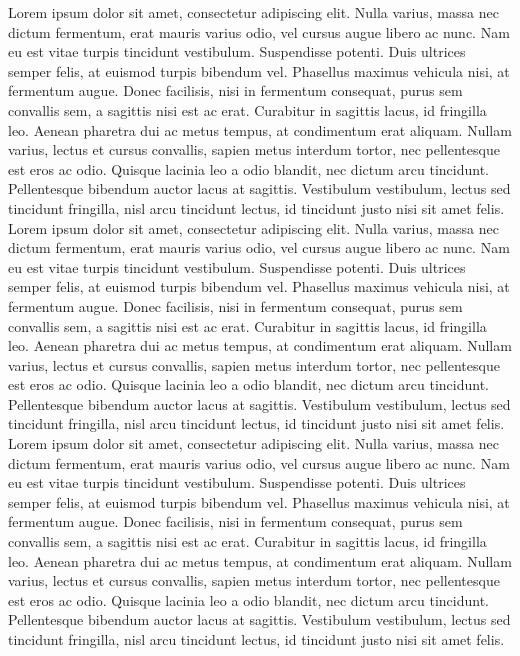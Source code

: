 \documentclass{article}  %
\begin{document}
\begin{justify}
Lorem ipsum dolor sit amet, consectetur adipiscing elit. Nulla varius, massa nec dictum fermentum, erat mauris varius odio, vel cursus augue libero ac nunc. Nam eu est vitae turpis tincidunt vestibulum. Suspendisse potenti. Duis ultrices semper felis, at euismod turpis bibendum vel. Phasellus maximus vehicula nisi, at fermentum augue. Donec facilisis, nisi in fermentum consequat, purus sem convallis sem, a sagittis nisi est ac erat. Curabitur in sagittis lacus, id fringilla leo. Aenean pharetra dui ac metus tempus, at condimentum erat aliquam. Nullam varius, lectus et cursus convallis, sapien metus interdum tortor, nec pellentesque est eros ac odio. Quisque lacinia leo a odio blandit, nec dictum arcu tincidunt. Pellentesque bibendum auctor lacus at sagittis. Vestibulum vestibulum, lectus sed tincidunt fringilla, nisl arcu tincidunt lectus, id tincidunt justo nisi sit amet felis.
Lorem ipsum dolor sit amet, consectetur adipiscing elit. Nulla varius, massa nec dictum fermentum, erat mauris varius odio, vel cursus augue libero ac nunc. Nam eu est vitae turpis tincidunt vestibulum. Suspendisse potenti. Duis ultrices semper felis, at euismod turpis bibendum vel. Phasellus maximus vehicula nisi, at fermentum augue. Donec facilisis, nisi in fermentum consequat, purus sem convallis sem, a sagittis nisi est ac erat. Curabitur in sagittis lacus, id fringilla leo. Aenean pharetra dui ac metus tempus, at condimentum erat aliquam. Nullam varius, lectus et cursus convallis, sapien metus interdum tortor, nec pellentesque est eros ac odio. Quisque lacinia leo a odio blandit, nec dictum arcu tincidunt. Pellentesque bibendum auctor lacus at sagittis. Vestibulum vestibulum, lectus sed tincidunt fringilla, nisl arcu tincidunt lectus, id tincidunt justo nisi sit amet felis.
Lorem ipsum dolor sit amet, consectetur adipiscing elit. Nulla varius, massa nec dictum fermentum, erat mauris varius odio, vel cursus augue libero ac nunc. Nam eu est vitae turpis tincidunt vestibulum. Suspendisse potenti. Duis ultrices semper felis, at euismod turpis bibendum vel. Phasellus maximus vehicula nisi, at fermentum augue. Donec facilisis, nisi in fermentum consequat, purus sem convallis sem, a sagittis nisi est ac erat. Curabitur in sagittis lacus, id fringilla leo. Aenean pharetra dui ac metus tempus, at condimentum erat aliquam. Nullam varius, lectus et cursus convallis, sapien metus interdum tortor, nec pellentesque est eros ac odio. Quisque lacinia leo a odio blandit, nec dictum arcu tincidunt. Pellentesque bibendum auctor lacus at sagittis. Vestibulum vestibulum, lectus sed tincidunt fringilla, nisl arcu tincidunt lectus, id tincidunt justo nisi sit amet felis.
\end{justify}
\end{document}
